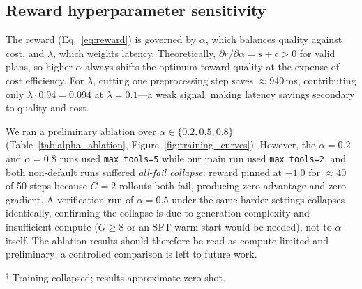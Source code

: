 \documentclass[10pt,twocolumn]{article}
\begin{document}
\subsection{Reward hyperparameter sensitivity}
\label{sec:sensitivity}

The reward (Eq.~\ref{eq:reward}) is governed by $\alpha$, which
balances quality against cost, and $\lambda$, which weights latency.
Theoretically, $\partial r / \partial \alpha = s + c > 0$ for valid
plans, so higher $\alpha$ always shifts the optimum toward quality at
the expense of cost efficiency.
For $\lambda$, cutting one preprocessing step saves $\approx$940\,ms,
contributing only $\lambda \cdot 0.94 = 0.094$ at $\lambda{=}0.1$---a
weak signal, making latency savings secondary to quality and cost.

We ran a preliminary ablation over $\alpha \in \{0.2, 0.5, 0.8\}$
(Table~\ref{tab:alpha_ablation}, Figure~\ref{fig:training_curves}).
However, the $\alpha{=}0.2$ and $\alpha{=}0.8$ runs used
\texttt{max\_tools=5} while our main run used \texttt{max\_tools=2},
and both non-default runs suffered \emph{all-fail collapse}: reward
pinned at $-1.0$ for $\approx$40 of 50 steps because $G{=}2$ rollouts
both fail, producing zero advantage and zero gradient.
A verification run of $\alpha{=}0.5$ under the same harder settings
collapses identically, confirming the collapse is due to generation
complexity and insufficient compute ($G{\geq}8$ or an SFT warm-start
would be needed), not to $\alpha$ itself.
The ablation results should therefore be read as compute-limited and
preliminary; a controlled comparison is left to future work.

\begin{table}[h]
\centering
\caption{Preliminary $\alpha$ ablation (single seed, $\lambda{=}0.1$).
$\alpha{=}0.2/0.8$ did not converge; see text.}
\label{tab:alpha_ablation}
\end{table}
{\small $^\dagger$ Training collapsed; results approximate zero-shot.}
\end{document}
